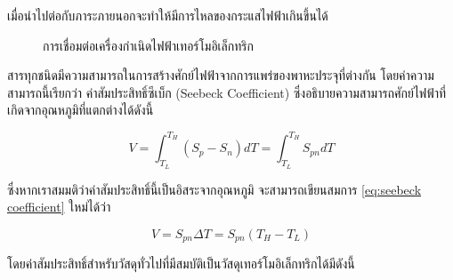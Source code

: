 \message{ !name(solar.tex)}\documentclass[
a4paper,
svgnames,
openany,
justified,
]{tufte-book}
\begin{document}
 เมื่อนำไปต่อกับภาระภายนอกจะทำให้มีการไหลของกระแสไฟฟ้าเกินขึ้นได้

\begin{figure}[h]
  \centering
  \caption{การเชื่อมต่อเครื่องกำเนิดไฟฟ้าเทอร์โมอิเล็กทริก}
\end{figure}

สารทุกชนิดมีความสามารถในการสร้างศักย์ไฟฟ้าจากการแพร่ของพาหะประจุที่ต่างกัน โดยค่าความสามารถนี้เรียกว่า ค่าสัมประสิทธิ์ซีเบ็ก (Seebeck Coefficient) ซึ่งอธิบายความสามารถศักย์ไฟฟ้าที่เกิดจากอุณหภูมิที่แตกต่างได้ดังนี้

\begin{equation}
  \label{eq:seebeck coefficient}
  V = \int_{T_L}^{T_H} \left( S_p - S_n \right) dT = \int_{T_L}^{T_H} S_{pn} dT
\end{equation}

ซึ่งหากเราสมมติว่าค่าสัมประสิทธิ์นี้เป็นอิสระจากอุณหภูมิ จะสามารถเขียนสมการ \ref{eq:seebeck coefficient} ใหม่ได้ว่า

\begin{equation}
  \label{eq:seebeck coefficient2}
  V = S_{pn} \Delta T = S_{pn} \left( T_H - T_L \right)
\end{equation}

โดยค่าสัมประสิทธิ์สำหรับวัสดุทั่วไปที่มีสมบัติเป็นวัสดุเทอร์โมอิเล็กทริกได้มีดังนี้
\end{document}

